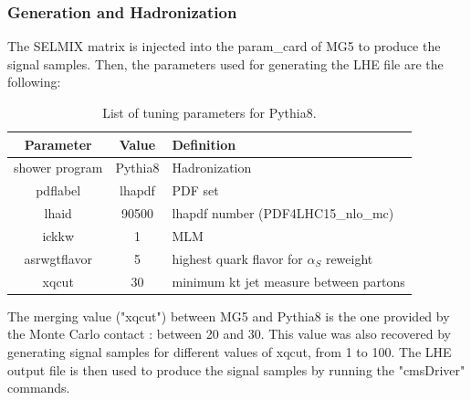\documentclass{cernatlasnote}
\begin{document}
 \subsubsection{Generation and Hadronization}
The SELMIX matrix is injected into the param\_card of MG5 to produce the signal samples.
Then, the parameters used for generating the LHE file are the following:
\begin{table}[h]
\begin{center}
\begin{tabular}{ |c|c|m{8cm}| } 
    \hline
    \rowcolor{lightgray} 
    Parameter & Value & Definition\\
    \hline 
    shower program & Pythia8 & Hadronization \\
    \hline
    pdflabel & lhapdf & PDF set  \\ 
    \hline
    lhaid & 90500 & lhapdf number (PDF4LHC15\_nlo\_mc)\\
    \hline
    ickkw & 1 & MLM \\
    \hline
    asrwgtflavor & 5 & highest quark flavor for $\alpha_{S}$ reweight \\
    \hline
    xqcut & 30 & minimum kt jet measure between partons \\
    \hline
\end{tabular}
\end{center}
\caption{List of tuning parameters for Pythia8.}
\label{TAB : GENPARA}
\end{table}
\FloatBarrier 
The merging value ("xqcut") between MG5 and Pythia8 is the one provided by the Monte Carlo contact : between 20 and 30. This value was also recovered by generating signal samples for different values of xqcut, from 1 to 100. The LHE output file is then used to produce the signal samples by running the "cmsDriver" commands.
\end{document}
